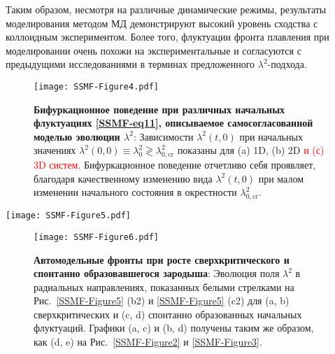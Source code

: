 Таким образом, несмотря на различные динамические режимы, результаты моделирования методом МД демонстрируют высокий уровень сходства с коллоидным экспериментом.
Более того, флуктуации фронта плавления при моделировании очень похожи на экспериментальные и согласуются с предыдущими исследованиями \cite{10.1038/ncomms7942} в терминах предложенного $\lambda^2$-подхода.

\begin{figure}[!t]
\centering
 \texttt{[image: SSMF-Figure4.pdf]}
 \caption{\textbf{Бифуркационное поведение при различных начальных флуктуациях \eqref {SSMF-eq11}, описываемое самосогласованной моделью эволюции $\lambda^2$}:
 Зависимости $\lambda^2(t, 0)$ при начальных значениях $ \lambda^2(0,0)\equiv\lambda_0 ^2\gtrless\lambda_{0,\mathrm {cr}}^2$ показаны для (a) 1D, (b) 2D \textcolor{red}{и (с) 3D систем}. Бифуркационное поведение отчетливо себя проявляет, благодаря качественному изменению вида $\lambda ^ 2(t,0)$ при малом изменении начального состояния в окрестности $\lambda_ {0,\mathrm{cr}}^2$.}
\label{SSMF-Figure4}
\end{figure}


\begin{figure*}[!t]
\centering
\texttt{[image: SSMF-Figure5.pdf]}
 \caption{\textbf{Эволюция различных начальных $\lambda^2$-флуктуаций и спонтанное зародышеобразование в однородной системе}:
 Последовательность снимков эволюции (a) докритической и (b) сверхкритической начальной флуктуации $\lambda^2$ и (c) спонтанного зарождения из-за теплового шума.}
\label{SSMF-Figure5}
\end{figure*}

\begin{figure}[!t]
\centering
\texttt{[image: SSMF-Figure6.pdf]}
 \caption{\textbf{Автомодельные фронты при росте сверхкритического и спонтанно образовавшегося зародыша}:
 Эволюция поля $ \lambda^2$ в радиальных направлениях, показанных белыми стрелками на Рис.~\ref{SSMF-Figure5} (b2) и \ref{SSMF-Figure5} (c2) для (a, b) сверхкритических и (c, d) спонтанно образованных начальных флуктуаций.
  Графики (a, c) и (b, d) получены таким же образом, как (d, e) на Рис.~\ref{SSMF-Figure2} и \ref{SSMF-Figure3}.}
\label{SSMF-Figure6}
\end{figure}


